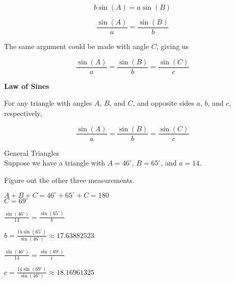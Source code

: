 \documentclass{ximera}
\begin{document}
\[     b \sin(A)  = a \sin(B)    \]


\[    \frac{\sin(A)}{a} = \frac{\sin(B)}{b}      \]




The same argument could be made with angle $C$, giving us








\[    \frac{\sin(A)}{a} = \frac{\sin(B)}{b}  = \frac{\sin(C)}{c}    \]






\begin{theorem}  \textbf{\textcolor{green!50!black}{Law of Sines}} 



For any triangle with angles $A$, $B$, and $C$, and opposite sides $a$, $b$, and $c$, respectively, 


\[    \frac{\sin(A)}{a} = \frac{\sin(B)}{b}  = \frac{\sin(C)}{c}    \]


\end{theorem}





\begin{example}  General Triangles \\

Suppose we have a triangle with $A=46^{\circ}$, $B=65^{\circ}$, and $a=14$.

Figure out the other three measurements.


\begin{explanation}

$A + B + C = 46^{\circ} + 65^{\circ} + C = 180$ \\

$C = 69^{\circ}$


$\frac{\sin(46^{\circ})}{14} = \frac{\sin(65^{\circ})}{b}$

$b = \frac{14 \sin(65^{\circ})}{\sin(46^{\circ})} \approx 17.63882523$

$\frac{\sin(46^{\circ})}{14} = \frac{\sin(69^{\circ})}{c}$

$c = \frac{14 \sin(69^{\circ})}{\sin(46^{\circ})} \approx 18.16961325$

\end{explanation}


\end{example}
\end{document}

